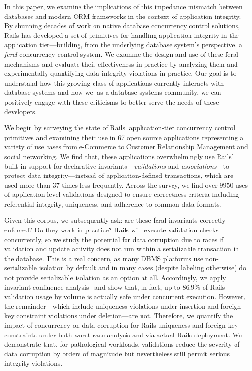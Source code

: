 In this paper, we examine the implications of this impedance mismatch
between databases and modern ORM frameworks in the context of
application integrity. By shunning decades of work on native database
concurrency control solutions, Rails has developed a set of primitives
for handling application integrity in the application tier---building,
from the underlying database system's perspective, a \textit{feral}
concurrency control system. We examine the design and use of these
feral mechanisms and evaluate their effectiveness in practice by
analyzing them and experimentally quantifying data integrity
violations in practice. Our goal is to understand how this growing
class of applications currently interacts with database systems and
how we, as a database systems community, we can positively engage with
these criticisms to better serve the needs of these developers.

We begin by surveying the state of Rails' application-tier concurrency
control primitives and examining their use in 67 open source
applications representing a variety of use cases from e-Commerce to
Customer Relationship Management and social networking. We find that,
these applications overwhelmingly use Rails' built-in support for
declarative invariants---\textit{validations} and
\textit{associations}---to protect data integrity---instead of
application-defined transactions, which are used more than 37 times less
frequently. Across the survey, we find over $9950$ uses of
application-level validations designed to ensure correctness criteria
including referential integrity, uniqueness, and adherence to common
data formats.

Given this corpus, we subsequently ask: are these feral invariants
correctly enforced? Do they work in practice? Rails will execute
validation checks concurrently, so we study the potential for data
corruption due to races if validation and update activity does not run
within a serializable transaction in the database. This is a real
concern, as many DBMS platforms use non-serializable isolation by
default and in many cases (despite labeling otherwise) do not provide
serializable isolation as an option at all.  Accordingly, we apply
invariant confluence analysis~\cite{coord-avoid} and show that, in
fact, up to $86.9\%$ of Rails validation usage by volume is actually
safe under concurrent execution. However, the remainder---which
include uniqueness violations under insertion and foreign key
constraint violations under deletion---are not. Therefore, we quantify
the impact of concurrency on data corruption for Rails uniqueness and
foreign key constraints under both worst-case analysis and via actual
Rails deployment. We demonstrate that, for pathological workloads,
validations reduce the severity of data corruption by orders of
magnitude but nevertheless still permit serious integrity violations.


